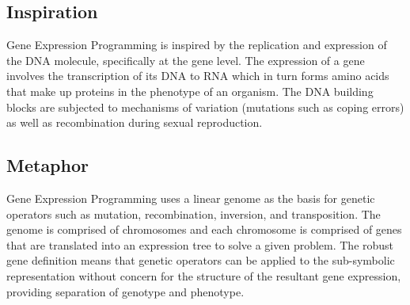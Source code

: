 \subsection{Inspiration}
Gene Expression Programming is inspired by the replication and expression of the DNA molecule, specifically at the gene level. 
The expression of a gene involves the transcription of its DNA to RNA which in turn forms amino acids that make up proteins in the phenotype of an organism. 
The DNA building blocks are subjected to mechanisms of variation (mutations such as coping errors) as well as recombination during sexual reproduction.


\subsection{Metaphor}
Gene Expression Programming uses a linear genome as the basis for genetic operators such as mutation, recombination, inversion, and transposition. The genome is comprised of chromosomes and each chromosome is comprised of genes that are translated into an expression tree to solve a given problem. The robust gene definition means that genetic operators can be applied to the sub-symbolic representation without concern for the structure of the resultant gene expression, providing separation of genotype and phenotype.

